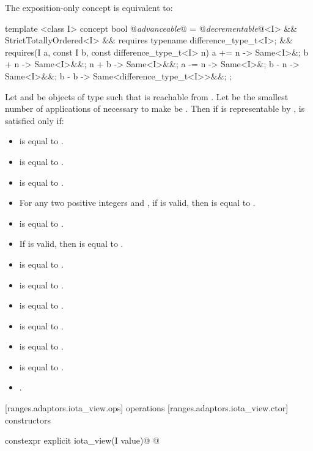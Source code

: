 \pnum
The exposition-only  concept is equivalent to:
\begin{codeblock}
template <class I>
concept bool @\textit{advanceable}@ =
@\textit{decrementable}@<I> && StrictTotallyOrdered<I> &&
  requires { typename difference_type_t<I>; } &&
  requires(I a, const I b, const difference_type_t<I> n) {
    { a += n } -> Same<I>&;
    { b + n } -> Same<I>&&;
    { n + b } -> Same<I>&&;
    { a -= n } -> Same<I>&;
    { b - n } -> Same<I>&&;
    { b - b } -> Same<difference_type_t<I>>&&;
  };
\end{codeblock}

Let  and  be objects of type  such that  is
reachable from . Let  be the smallest number of applications
of  necessary to make  be . Then if
 is representable by ,
 is satisfied only if:
\begin{itemize}
\item {} is equal to .
\item {} is equal to .
\item {} is equal to .
\item For any two positive integers  and , if
 is valid, then  is equal to
.
\item {} is equal to .
\item If  is valid, then  is equal to
.
\item {} is equal to .
\item {} is equal to .
\item {} is equal to .
\item {} is equal to .
\item {} is equal to .
\item {} is equal to .
\item {}.
\end{itemize}

[ranges.adaptors.iota_view.ops]{ operations}
[ranges.adaptors.iota_view.ctor]{ constructors}

%
\begin{itemdecl}
constexpr explicit iota_view(I value)@\added{;} @
\end{itemdecl}

